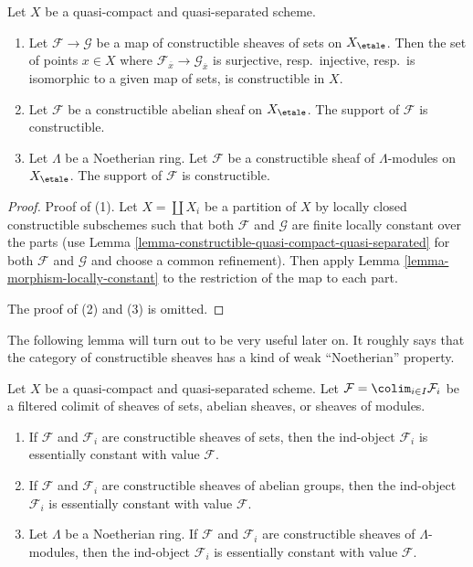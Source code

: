 \begin{lemma}
\label{lemma-support-constructible}
Let $X$ be a quasi-compact and quasi-separated scheme.
\begin{enumerate}
\item Let $\mathcal{F} \to \mathcal{G}$ be a map of constructible
sheaves of sets on $X_\etale$. Then the set of points $x \in X$
where $\mathcal{F}_{\overline{x}} \to \mathcal{G}_{\overline{x}}$
is surjective, resp.\ injective, resp.\ is isomorphic to a given map
of sets, is constructible in $X$.
\item Let $\mathcal{F}$ be a constructible abelian sheaf on $X_\etale$.
The support of $\mathcal{F}$ is constructible.
\item Let $\Lambda$ be a Noetherian ring.
Let $\mathcal{F}$ be a constructible sheaf of $\Lambda$-modules on $X_\etale$.
The support of $\mathcal{F}$ is constructible.
\end{enumerate}
\end{lemma}

\begin{proof}
Proof of (1).
Let $X = \coprod X_i$ be a partition of $X$ by locally closed constructible
subschemes such that both $\mathcal{F}$ and $\mathcal{G}$ are
finite locally constant over the parts (use
Lemma \ref{lemma-constructible-quasi-compact-quasi-separated}
for both $\mathcal{F}$ and $\mathcal{G}$ and choose a common
refinement). Then apply Lemma \ref{lemma-morphism-locally-constant}
to the restriction of the map to each part.

\medskip\noindent
The proof of (2) and (3) is omitted.
\end{proof}

\noindent
The following lemma will turn out to be very useful later on.
It roughly says that the category of constructible sheaves
has a kind of weak ``Noetherian'' property.

\begin{lemma}
\label{lemma-colimit-constructible}
Let $X$ be a quasi-compact and quasi-separated scheme. Let
$\mathcal{F} = \colim_{i \in I} \mathcal{F}_i$ be a filtered
colimit of sheaves of sets, abelian sheaves, or sheaves of modules.
\begin{enumerate}
\item If $\mathcal{F}$ and $\mathcal{F}_i$ are constructible sheaves of
sets, then the ind-object $\mathcal{F}_i$ is essentially constant with
value $\mathcal{F}$.
\item If $\mathcal{F}$ and $\mathcal{F}_i$ are constructible sheaves of
abelian groups, then the ind-object $\mathcal{F}_i$ is essentially constant
with value $\mathcal{F}$.
\item Let $\Lambda$ be a Noetherian ring.
If $\mathcal{F}$ and $\mathcal{F}_i$ are constructible sheaves of
$\Lambda$-modules, then the ind-object $\mathcal{F}_i$ is essentially constant
with value $\mathcal{F}$.
\end{enumerate}
\end{lemma}

